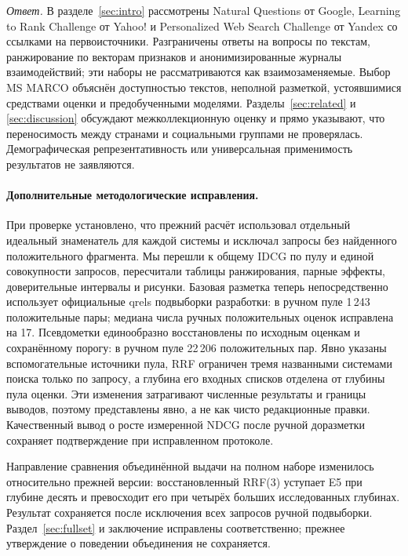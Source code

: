 \emph{Ответ.} В разделе~\ref{sec:intro} рассмотрены Natural Questions от Google, Learning to Rank Challenge от Yahoo! и Personalized Web Search Challenge от Yandex со ссылками на первоисточники. Разграничены ответы на вопросы по текстам, ранжирование по векторам признаков и анонимизированные журналы взаимодействий; эти наборы не рассматриваются как взаимозаменяемые. Выбор MS MARCO объяснён доступностью текстов, неполной разметкой, устоявшимися средствами оценки и предобученными моделями. Разделы~\ref{sec:related} и \ref{sec:discussion} обсуждают межколлекционную оценку и прямо указывают, что переносимость между странами и социальными группами не проверялась. Демографическая репрезентативность или универсальная применимость результатов не заявляются.

\paragraph{Дополнительные методологические исправления.}
При проверке установлено, что прежний расчёт использовал отдельный идеальный знаменатель для каждой системы и исключал запросы без найденного положительного фрагмента. Мы перешли к общему IDCG по пулу и единой совокупности запросов, пересчитали таблицы ранжирования, парные эффекты, доверительные интервалы и рисунки. Базовая разметка теперь непосредственно использует официальные qrels подвыборки разработки: в ручном пуле 1\,243 положительные пары; медиана числа ручных положительных оценок исправлена на 17. Псевдометки единообразно восстановлены по исходным оценкам и сохранённому порогу: в ручном пуле 22\,206 положительных пар. Явно указаны вспомогательные источники пула, RRF ограничен тремя названными системами поиска только по запросу, а глубина его входных списков отделена от глубины пула оценки. Эти изменения затрагивают численные результаты и границы выводов, поэтому представлены явно, а не как чисто редакционные правки. Качественный вывод о росте измеренной NDCG после ручной доразметки сохраняет подтверждение при исправленном протоколе.

Направление сравнения объединённой выдачи на полном наборе изменилось относительно прежней версии: восстановленный RRF(3) уступает E5 при глубине десять и превосходит его при четырёх больших исследованных глубинах. Результат сохраняется после исключения всех запросов ручной подвыборки. Раздел~\ref{sec:fullset} и заключение исправлены соответственно; прежнее утверждение о поведении объединения не сохраняется.
